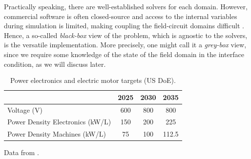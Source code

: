 Practically speaking, there are well-established solvers for each domain. However, commercial software is often closed-source and access to the internal variables during simulation is limited, making coupling the field-circuit domains difficult \cite{Gomes2017}. Hence, a so-called \textit{black-box} view of the problem, which is agnostic to the solvers, is the versatile implementation. More precisely, one might call it a \textit{grey-box} view, since we require some knowledge of the state of the field domain in the interface condition, as we will discuss later.

\begin{table}[htb]
  \centering
  \caption{Power electronics and electric motor targets (US DoE).}
  \label{tab:doe-targets}
  \begin{tabular}{lccc}
    \toprule
    & 2025 & 2030 & 2035 \\
    \midrule
    Voltage (V)                        	& 600 & 800 & 800   \\
    Power Density Electronics (kW/L)		& 150 & 200 & 225   \\
    Power Density Machines (kW/L)     	&  75 & 100 & 112.5 \\
    \bottomrule
  \end{tabular}
  \par\smallskip
  \footnotesize Data from \cite{USDRIVE_EDTT}.
\end{table}


